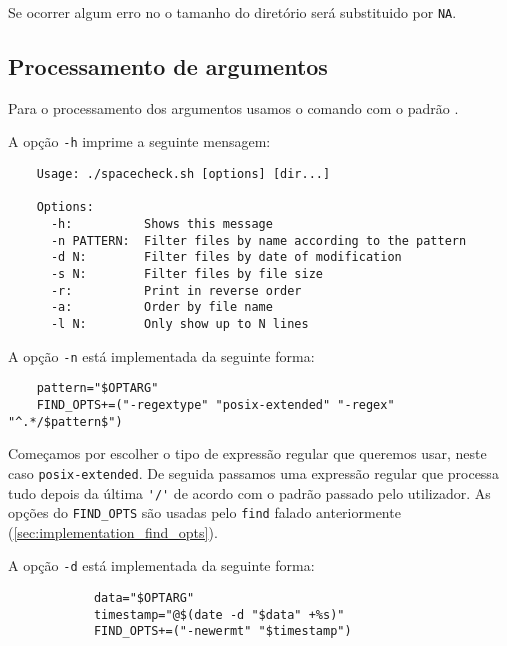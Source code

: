 Se ocorrer algum erro no  o tamanho do diretório será substituido por \Verb|NA|.

\subsection{Processamento de argumentos}\label{sec:implementation_arg_parsing}

Para o processamento dos argumentos usamos o comando  com o padrão .

A opção \Verb|-h| imprime a seguinte mensagem:

\begin{listing}[H]
	\centering
	\begin{verbatim}
    Usage: ./spacecheck.sh [options] [dir...]

    Options:
      -h:          Shows this message
      -n PATTERN:  Filter files by name according to the pattern
      -d N:        Filter files by date of modification
      -s N:        Filter files by file size
      -r:          Print in reverse order
      -a:          Order by file name
      -l N:        Only show up to N lines
  \end{verbatim}
\end{listing}

A opção \Verb|-n| está implementada da seguinte forma:

\begin{listing}[H]
	\centering
	\begin{verbatim}
    pattern="$OPTARG"
    FIND_OPTS+=("-regextype" "posix-extended" "-regex" "^.*/$pattern$")
  \end{verbatim}
\end{listing}

Começamos por escolher o tipo de expressão regular que queremos usar, neste caso \Verb|posix-extended|.
De seguida passamos uma expressão regular que processa tudo depois da última \Verb|'/'| de acordo com o padrão passado pelo utilizador.
As opções do \Verb|FIND_OPTS| são usadas pelo \Verb|find| falado anteriormente (\ref{sec:implementation_find_opts}).

A opção \Verb|-d| está implementada da seguinte forma:

\begin{listing}[H]
	\centering
	\begin{verbatim}
			data="$OPTARG"
			timestamp="@$(date -d "$data" +%s)"
			FIND_OPTS+=("-newermt" "$timestamp")
  \end{verbatim}
\end{listing}

